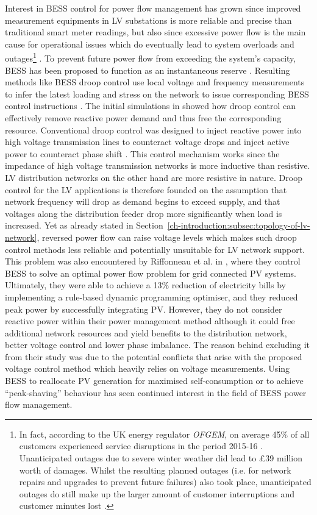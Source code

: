 Interest in BESS control for power flow management has grown since improved measurement equipments in LV substations is more reliable and precise than traditional smart meter readings, but also since excessive power flow is the main cause for operational issues which do eventually lead to system overloads and outages\footnote{
In fact, according to the UK energy regulator \textit{OFGEM}, on average 45\% of all customers experienced service disruptions in the period 2015-16 \cite{Ofgem2017}.
Unanticipated outages due to severe winter weather did lead to \pounds39 million worth of damages.
Whilst the resulting planned outages (i.e. for network repairs and upgrades to prevent future failures) also took place, unanticipated outages do still make up the larger amount of customer interruptions and customer minutes lost \cite{Ofgem2014}.
} \cite{Putrus2009, Pillai2010}.
To prevent future power flow from exceeding the system's capacity, BESS has been proposed to function as an instantaneous reserve \cite{Kunisch1986a, Kunisch1986}.
Resulting methods like BESS droop control use local voltage and frequency measurements to infer the latest loading and stress on the network to issue corresponding BESS control instructions \cite{Engler2005a}.
The initial simulations in \cite{Engler2005a} showed how droop control can effectively remove reactive power demand and thus free the corresponding resource. 
Conventional droop control was designed to inject reactive power into high voltage transmission lines to counteract voltage drops and inject active power to counteract phase shift \cite{Tayab2017}.
This control mechanism works since the impedance of high voltage transmission networks is more inductive than resistive.
LV distribution networks on the other hand are more resistive in nature.
Droop control for the LV applications is therefore founded on the assumption that network frequency will drop as demand begins to exceed supply, and that voltages along the distribution feeder drop more significantly when load is increased.
Yet as already stated in Section~\ref{ch-introduction:subsec:topology-of-lv-network}, reversed power flow can raise voltage levels which makes such droop control methods less reliable and potentially unsuitable for LV network support.
This problem was also encountered by Riffonneau et al. in \cite{Riffonneau2011}, where they control BESS to solve an optimal power flow problem for grid connected PV systems.
Ultimately, they were able to achieve a 13\% reduction of electricity bills by implementing a rule-based dynamic programming optimiser, and they reduced peak power by successfully integrating PV.
However, they do not consider reactive power within their power management method although it could free additional network resources and yield benefits to the distribution network, better voltage control and lower phase imbalance.
The reason behind excluding it from their study was due to the potential conflicts that arise with the proposed voltage control method which heavily relies on voltage measurements.
Using BESS to reallocate PV generation for maximised self-consumption \cite{SaniHassan2017} or to achieve ``peak-shaving'' behaviour \cite{Bennett2015, DePaola2016} has seen continued interest in the field of BESS power flow management.

